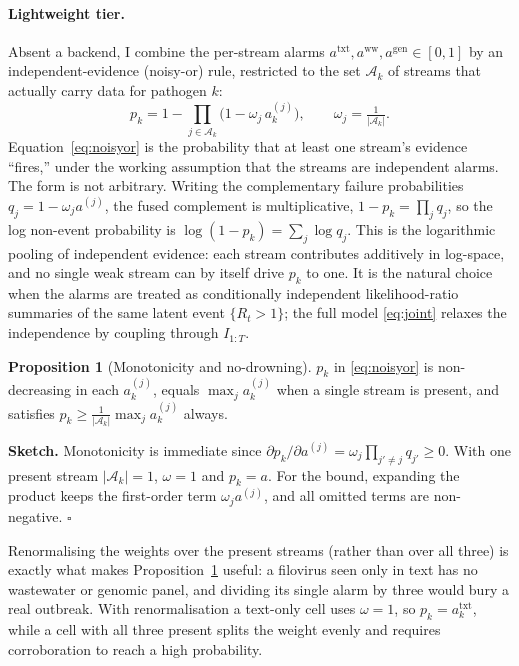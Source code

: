 \documentclass[10pt,twocolumn]{article}
\theoremstyle{definition}
\newtheorem{proposition}{Proposition}
\newcommand{\Rt}{R_t}
\begin{document}
\paragraph{Lightweight tier.}
Absent a backend, I combine the per-stream alarms
$a^{\mathrm{txt}},a^{\mathrm{ww}},a^{\mathrm{gen}}\in[0,1]$ by an
independent-evidence (noisy-or) rule, restricted to the set $\mathcal A_k$ of
streams that actually carry data for pathogen $k$:
\begin{equation}
p_k = 1-\prod_{j\in\mathcal A_k}\big(1-\omega_j\,a^{(j)}_k\big),\qquad \omega_j=\tfrac{1}{|\mathcal A_k|}.
\label{eq:noisyor}
\end{equation}
Equation~\eqref{eq:noisyor} is the probability that at least one stream's evidence
``fires,'' under the working assumption that the streams are independent alarms.
The form is not arbitrary. Writing the complementary failure probabilities
$q_j=1-\omega_j a^{(j)}$, the fused complement is multiplicative,
$1-p_k=\prod_j q_j$, so the log non-event probability is
$\log(1-p_k)=\sum_j\log q_j$. This is the logarithmic pooling of independent
evidence: each stream contributes additively in log-space, and no single weak
stream can by itself drive $p_k$ to one. It is the natural choice when the
alarms are treated as conditionally independent likelihood-ratio summaries of the
same latent event $\{\Rt>1\}$; the full model \eqref{eq:joint} relaxes the
independence by coupling through $I_{1:T}$.

\begin{proposition}[Monotonicity and no-drowning]\label{prop:fuse}
$p_k$ in \eqref{eq:noisyor} is non-decreasing in each $a^{(j)}_k$, equals
$\max_j a^{(j)}_k$ when a single stream is present, and satisfies
$p_k\ge\frac{1}{|\mathcal A_k|}\max_j a^{(j)}_k$ always.
\end{proposition}
\noindent\textbf{Sketch.} Monotonicity is immediate since
$\partial p_k/\partial a^{(j)}=\omega_j\prod_{j'\ne j}q_{j'}\ge0$. With one
present stream $|\mathcal A_k|{=}1$, $\omega{=}1$ and $p_k=a$. For the bound,
expanding the product keeps the first-order term $\omega_j a^{(j)}$, and all
omitted terms are non-negative. $\square$

Renormalising the weights over the present streams (rather than over all
three) is exactly what makes Proposition~\ref{prop:fuse} useful: a filovirus seen
only in text has no wastewater or genomic panel, and dividing its single alarm by
three would bury a real outbreak. With renormalisation a text-only cell uses
$\omega=1$, so $p_k=a^{\mathrm{txt}}_k$, while a cell with all three present
splits the weight evenly and requires corroboration to reach a high probability.
\end{document}
